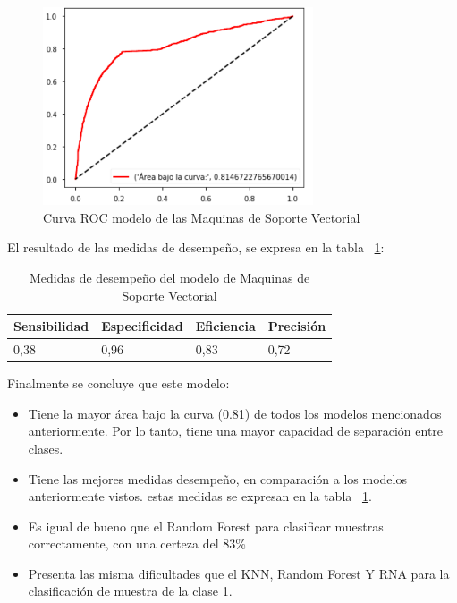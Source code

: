 \documentclass[conference]{IEEEtran}
\begin{document}
\begin{center}
    \begin{figure}[h]
        \hfill
     \centerline{\includegraphics[width=8cm]{ROCSVM.png}}
    \caption{Curva ROC modelo de las Maquinas de Soporte Vectorial}
    \label{fig:rocSVM}
    \end{figure}  
\end{center}
El resultado de las medidas de desempeño, se expresa en la tabla ~\ref{tab:medidasRNA}: 
\newline
\begin{table}[h]
\centering
\begin{tabular}{|l|l|l|l|}
\hline
Sensibilidad & Especificidad & \multicolumn{1}{r|}{Eficiencia} & Precisión \\ \hline
0,38         & 0,96          & 0,83                            & 0,72      \\ \hline
\end{tabular}
\caption{Medidas de desempeño del modelo de Maquinas de Soporte Vectorial}
\label{tab:medidasRNA}
\end{table}

Finalmente se concluye que este modelo:
\begin{itemize}
\item Tiene la mayor área bajo la curva (0.81) de todos los modelos mencionados anteriormente. Por lo tanto, tiene una mayor capacidad de separación entre clases.
\item Tiene las mejores medidas desempeño, en comparación a los modelos anteriormente vistos. estas medidas se expresan en la tabla ~\ref{tab:medidasRNA}.
\item Es igual de bueno que el Random Forest para clasificar muestras correctamente, con una certeza del 83\%
\item Presenta las misma dificultades que el KNN, Random Forest Y RNA para la clasificación de muestra de la clase 1.
\end{itemize}
\end{document}
